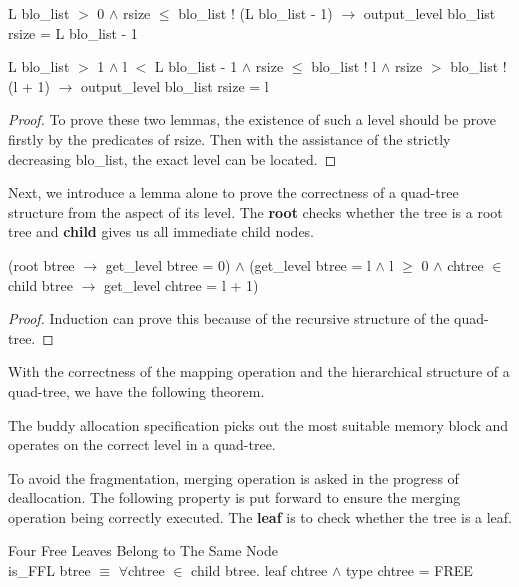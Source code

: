 \documentclass[runningheads]{llncs}
\begin{document}
\begin{lemma}
L blo\_list $>$ 0 $\wedge$ rsize $\leq$ blo\_list ! (L blo\_list - 1) $\longrightarrow$ output\_level blo\_list rsize = L blo\_list - 1
\end{lemma}

\begin{lemma}
L blo\_list $>$ 1 $\wedge$ l $<$ L blo\_list - 1 $\wedge$ rsize $\leq$ blo\_list ! l $\wedge$ rsize $>$ blo\_list ! (l + 1) $\longrightarrow$ output\_level blo\_list rsize = l
\end{lemma}

\begin{proof}
To prove these two lemmas, the existence of such a level should be prove firstly by the predicates of rsize. Then with the assistance of the strictly decreasing blo\_list, the exact level can be located.
\end{proof}

Next, we introduce a lemma alone to prove the correctness of a quad-tree structure from the aspect of its level. The \textbf{root} checks whether the tree is a root tree and \textbf{child} gives us all immediate child nodes.

\begin{lemma}
(root btree $\longrightarrow$ get\_level btree = 0) $\wedge$ (get\_level btree = l $\wedge$ l $\geq$ 0 $\wedge$ chtree $\in$ child btree $\longrightarrow$ get\_level chtree = l + 1)
\end{lemma}

\begin{proof}
Induction can prove this because of the recursive structure of the quad-tree.
\end{proof}

With the correctness of the mapping operation and the hierarchical structure of a quad-tree, we have the following theorem.

\begin{theorem}
The buddy allocation specification picks out the most suitable memory block and operates on the correct level in a quad-tree.
\end{theorem}

To avoid the fragmentation, merging operation is asked in the progress of deallocation. The following property is put forward to ensure the merging operation being correctly executed. The \textbf{leaf} is to check whether the tree is a leaf.

\begin{definition} {Four Free Leaves Belong to The Same Node} \\
is\_FFL btree $\equiv$ $\forall$chtree $\in$ child btree. leaf chtree $\wedge$ type chtree = FREE
\end{definition}
\end{document}
